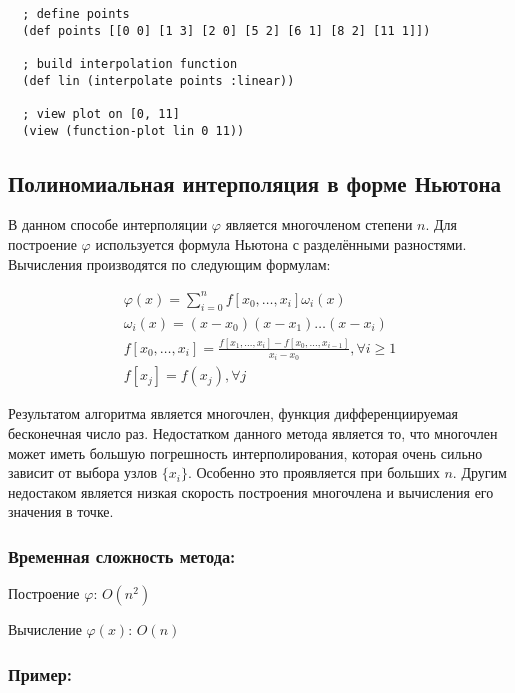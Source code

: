 \begin{verbatim}
  ; define points
  (def points [[0 0] [1 3] [2 0] [5 2] [6 1] [8 2] [11 1]])

  ; build interpolation function
  (def lin (interpolate points :linear))

  ; view plot on [0, 11]
  (view (function-plot lin 0 11))
\end{verbatim}



\subsection{Полиномиальная интерполяция в форме Ньютона}

В данном способе интерполяции $\varphi$ является многочленом степени $n$. Для построение $\varphi$ используется формула Ньютона с разделёнными разностями. Вычисления производятся по следующим формулам:

\begin{equation}
  \begin{gathered}
    \varphi(x) = \sum_{i=0}^n f[x_0, \dotsc, x_i] \omega_i(x) \\
    \omega_i(x) = (x - x_0)(x - x_1) \dotsc (x - x_i) \\
    f[x_0, \dotsc, x_i] = \frac{f[x_1, \dotsc, x_i] - f[x_0, \dotsc, x_{i-1}]}{x_i - x_0}, \forall i \geq 1 \\
    f[x_j] = f(x_j), \forall j
  \end{gathered}
\end{equation}

Результатом алгоритма является многочлен, функция дифференциируемая бесконечная число раз. Недостатком данного метода является то, что многочлен может иметь большую погрешность интерполирования, которая очень сильно зависит от выбора узлов $\{x_i\}$. Особенно это проявляется при больших $n$. Другим недостаком является низкая скорость построения многочлена и вычисления его значения в точке.

\subsubsection{Временная сложность метода:}

Построение $\varphi$: $O(n^2)$

Вычисление $\varphi(x)$: $O(n)$

\subsubsection{Пример:}

